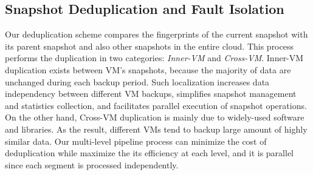 \subsection{Snapshot Deduplication and Fault Isolation}
\label{sect:dedupe}
Our  deduplication scheme compares the fingerprints of the current snapshot
with its parent snapshot and also other snapshots in the entire cloud.
This process performs   the duplication in two categories: \textit{Inner-VM} and \textit{Cross-VM}. 
Inner-VM duplication exists between VM's snapshots, because the majority of data are unchanged during each backup period. 
Such localization increases data independency between different VM backups,
simplifies snapshot management and statistics collection,
and facilitates parallel execution of snapshot operations.
On the other hand, Cross-VM duplication is mainly due to widely-used software and libraries. 
As the result, different VMs tend to backup large amount of highly similar data.
Our multi-level pipeline process can minimize 
the cost of deduplication while maximize the its efficiency at each level,
and it is parallel since each segment is processed independently.

